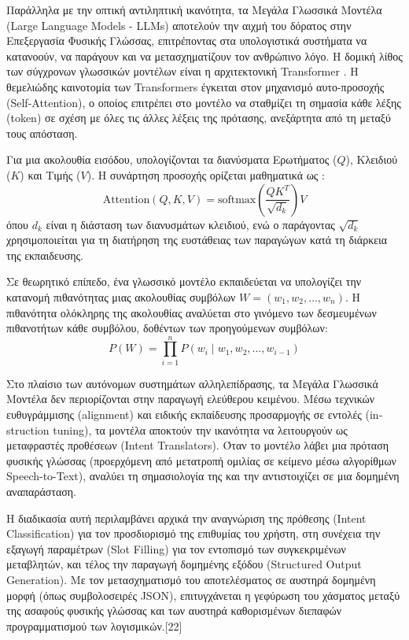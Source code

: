 \documentclass[twoside, a4paper, 11pt]{article}
\newcommand{\textlatin}[1]{\textenglish{#1}}
\begin{document}
Παράλληλα με την οπτική αντιληπτική ικανότητα, τα Μεγάλα Γλωσσικά Μοντέλα (\textlatin{Large Language Models - LLMs}) αποτελούν την αιχμή του δόρατος στην Επεξεργασία Φυσικής Γλώσσας, επιτρέποντας στα υπολογιστικά συστήματα να κατανοούν, να παράγουν και να μετασχηματίζουν τον ανθρώπινο λόγο. Η δομική λίθος των σύγχρονων γλωσσικών μοντέλων είναι η αρχιτεκτονική \textlatin{Transformer} \cite{vaswani2017attention}. Η θεμελιώδης καινοτομία των \textlatin{Transformers} έγκειται στον μηχανισμό αυτο-προσοχής (\textlatin{Self-Attention}), ο οποίος επιτρέπει στο μοντέλο να σταθμίζει τη σημασία κάθε λέξης (\textlatin{token}) σε σχέση με όλες τις άλλες λέξεις της πρότασης, ανεξάρτητα από τη μεταξύ τους απόσταση.

Για μια ακολουθία εισόδου, υπολογίζονται τα διανύσματα Ερωτήματος ($Q$), Κλειδιού ($K$) και Τιμής ($V$). Η συνάρτηση προσοχής ορίζεται μαθηματικά ως \cite{vaswani2017attention}:
\begin{equation}
\text{Attention}(Q, K, V) = \text{softmax}\left(\frac{QK^T}{\sqrt{d_k}}\right)V
\end{equation}
όπου $d_k$ είναι η διάσταση των διανυσμάτων κλειδιού, ενώ ο παράγοντας $\sqrt{d_k}$ χρησιμοποιείται για τη διατήρηση της ευστάθειας των παραγώγων κατά τη διάρκεια της εκπαιδευσης.

Σε θεωρητικό επίπεδο, ένα γλωσσικό μοντέλο εκπαιδεύεται να υπολογίζει την κατανομή πιθανότητας μιας ακολουθίας συμβόλων $W = (w_1, w_2, \dots, w_n)$. Η πιθανότητα ολόκληρης της ακολουθίας αναλύεται στο γινόμενο των δεσμευμένων πιθανοτήτων κάθε συμβόλου, δοθέντων των προηγούμενων συμβόλων:
\begin{equation}
P(W) = \prod_{i=1}^{n} P(w_i \mid w_1, w_2, \dots, w_{i-1})
\end{equation}

Στο πλαίσιο των αυτόνομων συστημάτων αλληλεπίδρασης, τα Μεγάλα Γλωσσικά Μοντέλα δεν περιορίζονται στην παραγωγή ελεύθερου κειμένου. Μέσω τεχνικών ευθυγράμμισης (\textlatin{alignment}) και ειδικής εκπαίδευσης προσαρμογής σε εντολές (\textlatin{instruction tuning}), τα μοντέλα αποκτούν την ικανότητα να λειτουργούν ως μεταφραστές προθέσεων (\textlatin{Intent Translators}). Όταν το μοντέλο λάβει μια πρόταση φυσικής γλώσσας (προερχόμενη από μετατροπή ομιλίας σε κείμενο μέσω αλγορίθμων \textlatin{Speech-to-Text}), αναλύει τη σημασιολογία της και την αντιστοιχίζει σε μια δομημένη αναπαράσταση.

Η διαδικασία αυτή περιλαμβάνει αρχικά την αναγνώριση της πρόθεσης (\textlatin{Intent Classification}) για τον προσδιορισμό της επιθυμίας του χρήστη, στη συνέχεια την εξαγωγή παραμέτρων (\textlatin{Slot Filling}) για τον εντοπισμό των συγκεκριμένων μεταβλητών, και τέλος την παραγωγή δομημένης εξόδου (\textlatin{Structured Output Generation}). Με τον μετασχηματισμό του αποτελέσματος σε αυστηρά δομημένη μορφή (όπως συμβολοσειρές \textlatin{JSON}), επιτυγχάνεται η γεφύρωση του χάσματος μεταξύ της ασαφούς φυσικής γλώσσας και των αυστηρά καθορισμένων διεπαφών προγραμματισμού των λογισμικών.[22]
\end{document}

